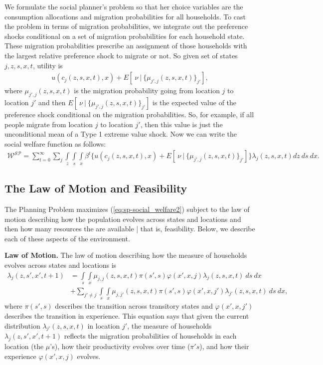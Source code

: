 \documentclass[12pt,pdftex]{article}
\begin{document}
We formulate the social planner's problem so that her choice variables are the consumption allocations and migration probabilities for all households. To cast the problem in terms of migration probabilities, we integrate out the preference shocks conditional on a set of migration probabilities for each household state. These migration probabilities prescribe an assignment of those households with the largest relative preference shock to migrate or not. So given set of states $j, z, s, x, t$, utility is
\begin{align}
u(c_{j}(z, s, x, t), x) + E[ \ \nu \ | \ \big\{\mu_{j',j}(z,s,x,t)\big\}_{j'} ],
\label{eq:utility-shocks}
\end{align}
where $\mu_{j',j}(z,s,x,t)$ is the migration probability going from location $j$ to location $j'$ and then $E[ \ \nu \ | \ \big\{\mu_{j',j}(z,s,x,t)\big\}_{j'} ]$ is the expected value of the preference shock conditional on the migration probabilities. So, for example, if all people migrate from location $j$ to location $j'$, then this value is just the unconditional mean of a Type 1 extreme value shock. Now we can write the social welfare function as follows:
\begin{align}
\mathcal{W^{SP}} = \sum_{t=0}^{\infty}\sum_{j} \int\limits_{z} \int\limits_{s} \int\limits_{x} \beta^{t} \bigg \{ u(c_{j}(z, s, x, t), x) + E[ \ \nu \ | \ \big\{\mu_{j',j}(z,s,x,t)\big\}_{j'}] \bigg \} \lambda_{j}(z, s, x, t) dz \ ds \ dx.
\label{eq:sp-social_welfare2}
\end{align}

\subsection{The Law of Motion and Feasibility}

The Planning Problem maximizes (\ref{eq:sp-social_welfare2}) subject to the law of motion describing how the population evolves across states and locations and then how many resources the are available | that is, feasibility. Below, we describe each of these aspects of the environment.

\textbf{Law of Motion.} The law of motion describing how the measure of households evolves across states and locations is
\begin{align}
\lambda_{j}(z, s', x', t+1)  & =  \int\limits_{s} \int\limits_{x}  \mu_{j,j}(z, s,x,t)\pi(s',s) \varphi(x',x, j) \lambda_{j}(z, s, x, t)  \ ds \ dx  \  \label{eq:planner_law_motion} \\
& +  \sum_{j' \neq j} \int\limits_{s} \int\limits_{x} \mu_{j,j'}(z, s,x,t) \pi(s',s) \varphi(x',x, j') \lambda_{j'}(z, s, x, t)  \ ds  \ dx, \nonumber
\end{align}
where $\pi(s',s)$ describes the transition across transitory states and $\varphi(x',x, j')$ describes the transition in experience. This equation says that given the current distribution $\lambda_{j'}(z, s, x, t)$ in location $j'$, the measure of households $\lambda_{j}(z, s', x', t+1)$ reflects the migration probabilities of households in each location (the $\mu$'s), how their productivity evolves over time ($\pi's$), and how their experience $\varphi(x',x, j)$ evolves.
\end{document}
